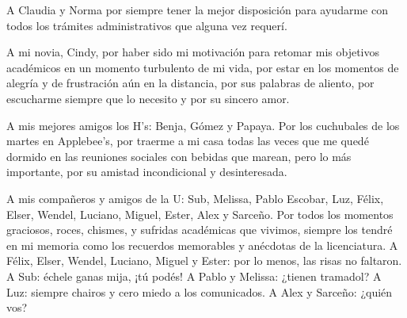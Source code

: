 A Claudia y Norma por siempre tener la mejor disposición para ayudarme 
con todos los trámites administrativos que alguna vez requerí. 

A mi novia, Cindy, por haber sido mi motivación para retomar mis 
objetivos académicos en un momento turbulento de mi vida, 
por estar en los momentos de alegría y de frustración aún en la distancia, 
por sus palabras de aliento, por escucharme siempre que lo necesito y 
por su sincero amor.

A mis mejores amigos los H's: Benja, Gómez y Papaya. Por los cuchubales de
los martes en Applebee's, por traerme a mi casa todas las veces que 
me quedé dormido en las reuniones sociales con bebidas que marean, 
pero lo más importante, por su amistad 
incondicional y desinteresada.

A mis compañeros y amigos de la U: Sub, Melissa, Pablo Escobar, 
Luz, Félix, Elser, Wendel, Luciano, Miguel, Ester,  Alex y Sarceño.
Por todos los momentos graciosos, roces, chismes, y sufridas académicas 
que vivimos, siempre los tendré en mi memoria como los recuerdos memorables y 
anécdotas de la licenciatura. A Félix, Elser, Wendel, Luciano, Miguel y Ester: 
por lo menos, las risas no faltaron. A Sub: échele ganas mija, ¡tú podés! 
A Pablo y Melissa: ¿tienen tramadol? A Luz: siempre chairos y cero miedo 
a los comunicados. A Alex y Sarceño: ¿quién vos? 
% 
\thispagestyle{empty}